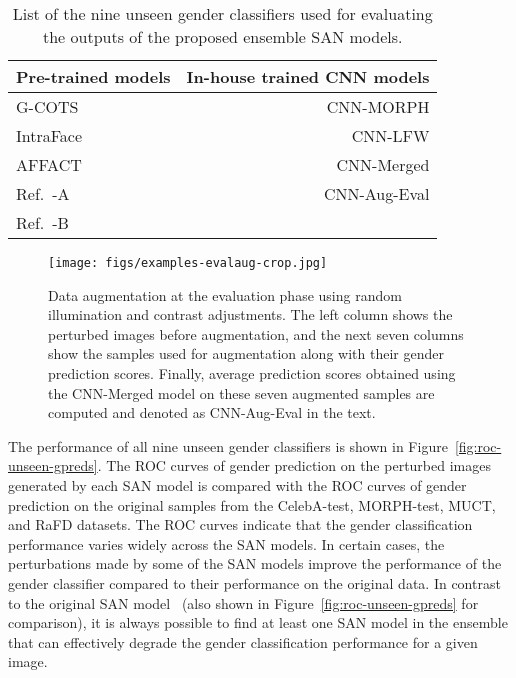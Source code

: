\documentclass[10pt,twocolumn,letterpaper]{article}
\begin{document}
\begin{table}
\begin{center}
\caption{List of the nine unseen gender classifiers used for evaluating the outputs of the proposed ensemble SAN models.}
\label{tab:unseen-gpreds}
\centering
\begin{tabular}{l|r}
\toprule
Pre-trained models & In-house trained CNN models\\
\midrule
G-COTS & CNN-MORPH\\
IntraFace~\cite{de_la_torre_intraface_2015_long} & CNN-LFW\\
AFFACT~\cite{gunther_affact_2016} & CNN-Merged\\
Ref.~\cite{arriaga_real_2017}-A & CNN-Aug-Eval\\
Ref.~\cite{arriaga_real_2017}-B & \\
\bottomrule
\end{tabular}
\end{center}
\end{table}

\begin{figure}
\begin{center}
   \texttt{[image: figs/examples-evalaug-crop.jpg]}
\end{center}
   \caption{Data augmentation at the evaluation phase using random illumination and contrast adjustments. The left column shows the perturbed images before augmentation, and the next seven columns show the samples used for augmentation along with their gender prediction scores. Finally, average prediction scores obtained using the CNN-Merged model on these seven augmented samples are computed and denoted as CNN-Aug-Eval in the text.}
\label{fig:example-evalaug}
\end{figure}

The performance of all nine unseen gender classifiers is shown in Figure~\ref{fig:roc-unseen-gpreds}. The ROC curves of gender prediction on the perturbed images generated by each SAN model is compared with the ROC curves of gender prediction on the original samples from the CelebA-test, MORPH-test, MUCT, and RaFD datasets. The ROC curves indicate that the gender classification performance varies widely across the SAN models. In certain cases, the perturbations made by some of the SAN models improve the performance of the gender classifier compared to their performance on the original data. In contrast to the original SAN model~\cite{mirjalili_semi_2018} (also shown in Figure~\ref{fig:roc-unseen-gpreds} for comparison), it is always possible to find at least one SAN model in the ensemble that can effectively degrade the gender classification performance for a given image. %
\end{document}
